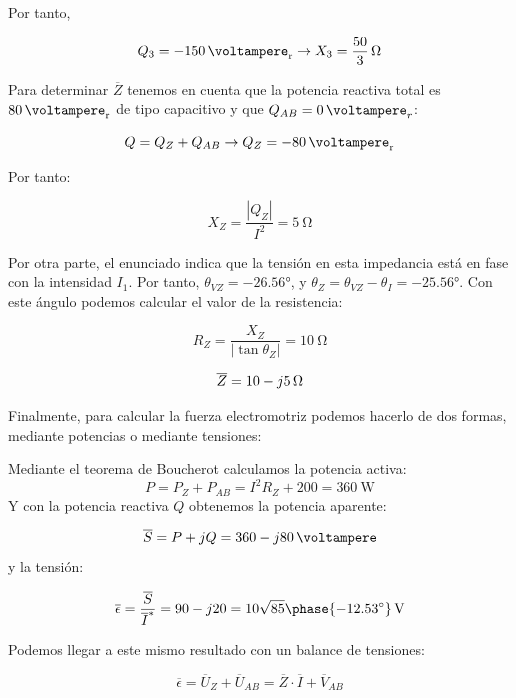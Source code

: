\documentclass[12pt]{article}
\begin{document}
Por tanto,

\[
   Q_3 = -\SI{150}{\voltampere_r} \rightarrow X_3 = \SI[parse-numbers=false]{\frac{50}{3}}{\ohm}
\]

Para determinar $\overline{Z}$ tenemos en cuenta que la potencia reactiva total es $\SI{80}{\voltampere_r}$ de tipo capacitivo y que $Q_{AB} = \SI{0}{\voltampere}_r$:

\[
  Q = Q_Z + Q_{AB} \rightarrow Q_Z = -\SI{80}{\voltampere_r} 
\]

Por tanto:

\[
  X_Z = \frac{|Q_Z|}{I^2} = \SI{5}{\ohm}
\]

Por otra parte, el enunciado indica que la tensión en esta impedancia está en fase con la intensidad $I_1$. Por tanto, $\theta_{VZ} = \ang{-26.56}$, y $\theta_Z = \theta_{VZ} - \theta_{I} = \ang{-25.56}$. Con este ángulo podemos calcular el valor de la resistencia:

\[
  R_Z = \frac{X_Z}{|\tan\theta_Z|} = \SI{10}{\ohm}
\]

\[
  \overline{Z} =  \SI[parse-numbers=false]{10 - j5}{\ohm}
\]

Finalmente, para calcular la fuerza electromotriz podemos hacerlo de dos formas, mediante potencias o mediante tensiones:

Mediante el teorema de Boucherot calculamos la potencia activa:
\[
P = P_Z + P_{AB} = I^2 R_Z + 200 = \SI{360}{\watt}
\]
Y con la potencia reactiva $Q$ obtenemos la potencia aparente:

\[
  \overline{S} = P + jQ = \SI[parse-numbers=false]{360 -j80}{\voltampere}
\]
y la tensión:

\[
  \overline{\epsilon} = \frac{\overline{S}}{\overline{I}^*} = 90 - j20 = \SI[parse-numbers=false]{10\sqrt{85}\phase{\ang{-12.53}}}{\volt}
\]

Podemos llegar a este mismo resultado con un balance de tensiones:

\[
  \overline{\epsilon} = \overline{U}_Z + \overline{U}_{AB} = \overline{Z} \cdot \overline{I} + \overline{V}_{AB}
\]
\end{document}
